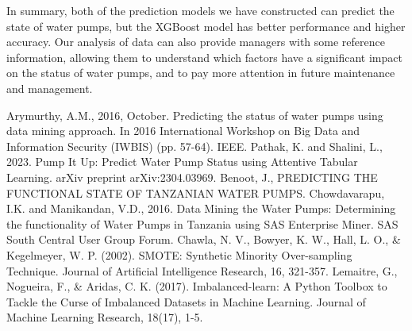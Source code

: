 \documentclass[conference]{IEEEtran}
\begin{document}
In summary, both of the prediction models we have constructed can predict the state of water pumps, but the XGBoost model has better performance and higher accuracy. Our analysis of data can also provide managers with some reference information, allowing them to understand which factors have a significant impact on the status of water pumps, and to pay more attention in future maintenance and management.

\begin{thebibliography}{00}
 Arymurthy, A.M., 2016, October. Predicting the status of water pumps using data mining approach. In 2016 International Workshop on Big Data and Information Security (IWBIS) (pp. 57-64). IEEE.
 Pathak, K. and Shalini, L., 2023. Pump It Up: Predict Water Pump Status using Attentive Tabular Learning. arXiv preprint arXiv:2304.03969.
 Benoot, J., PREDICTING THE FUNCTIONAL STATE OF TANZANIAN WATER PUMPS.
 Chowdavarapu, I.K. and Manikandan, V.D., 2016. Data Mining the Water Pumps: Determining the functionality of Water Pumps in Tanzania using SAS Enterprise Miner. SAS South Central User Group Forum.
 Chawla, N. V., Bowyer, K. W., Hall, L. O., \& Kegelmeyer, W. P. (2002). SMOTE: Synthetic Minority Over-sampling Technique. Journal of Artificial Intelligence Research, 16, 321-357.
 Lemaitre, G., Nogueira, F., \& Aridas, C. K. (2017). Imbalanced-learn: A Python Toolbox to Tackle the Curse of Imbalanced Datasets in Machine Learning. Journal of Machine Learning Research, 18(17), 1-5.
\end{thebibliography}
\end{document}

